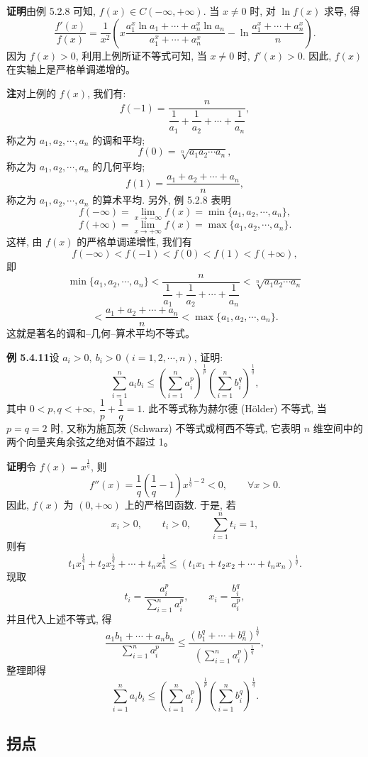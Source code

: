 \documentclass[UTF8, 12pt, fontset=fandol, oneside]{ctexart}
\begin{document}
\noindent\textbf{证明}\quad 由例 5.2.8 可知, $f(x)\in C(-\infty,+\infty)$. 当 $x\ne0$ 时, 对 $\ln f(x)$ 求导, 得
\[
  \frac{f'(x)}{f(x)}
  =\frac1{x^2}\left(
  x\frac{a_1^x\ln a_1+\cdots+a_n^x\ln a_n}{a_1^x+\cdots+a_n^x}
  -\ln\frac{a_1^x+\cdots+a_n^x}{n}\right).
\]
因为 $f(x)>0$, 利用上例所证不等式可知, 当 $x\ne0$ 时, $f'(x)>0$. 因此, $f(x)$ 在实轴上是严格单调递增的。

\noindent\textbf{注}\quad 对上例的 $f(x)$, 我们有:
\[
  f(-1)=\frac{n}{\dfrac1{a_1}+\dfrac1{a_2}+\cdots+\dfrac1{a_n}},
\]
称之为 $a_1,a_2,\cdots,a_n$ 的调和平均;
\[
  f(0)=\sqrt[n]{a_1a_2\cdots a_n},
\]
称之为 $a_1,a_2,\cdots,a_n$ 的几何平均;
\[
  f(1)=\frac{a_1+a_2+\cdots+a_n}{n},
\]
称之为 $a_1,a_2,\cdots,a_n$ 的算术平均. 另外, 例 5.2.8 表明
\[
  f(-\infty)=\lim_{x\to-\infty}f(x)=\min\{a_1,a_2,\cdots,a_n\},
\]
\[
  f(+\infty)=\lim_{x\to+\infty}f(x)=\max\{a_1,a_2,\cdots,a_n\}.
\]
这样, 由 $f(x)$ 的严格单调递增性, 我们有
\[
  f(-\infty)<f(-1)<f(0)<f(1)<f(+\infty),
\]
即
\[
  \min\{a_1,a_2,\cdots,a_n\}
  <\frac{n}{\dfrac1{a_1}+\dfrac1{a_2}+\cdots+\dfrac1{a_n}}
  <\sqrt[n]{a_1a_2\cdots a_n}
\]
\[
  <\frac{a_1+a_2+\cdots+a_n}{n}
  <\max\{a_1,a_2,\cdots,a_n\}.
\]
这就是著名的调和--几何--算术平均不等式。

\noindent\textbf{例 5.4.11}\quad 设 $a_i>0,\ b_i>0\ (i=1,2,\cdots,n)$, 证明:
\[
  \sum_{i=1}^n a_i b_i
  \leqslant
  \left(\sum_{i=1}^n a_i^p\right)^{\frac1p}
  \left(\sum_{i=1}^n b_i^q\right)^{\frac1q},
\]
其中 $0<p,q<+\infty,\ \dfrac1p+\dfrac1q=1$. 此不等式称为赫尔德 (H\"older) 不等式, 当 $p=q=2$ 时, 又称为施瓦茨 (Schwarz) 不等式或柯西不等式, 它表明 $n$ 维空间中的两个向量夹角余弦之绝对值不超过 1。

\noindent\textbf{证明}\quad 令 $f(x)=x^{\frac1q}$, 则
\[
  f''(x)=\frac1q\left(\frac1q-1\right)x^{\frac1q-2}<0,\qquad \forall x>0.
\]
因此, $f(x)$ 为 $(0,+\infty)$ 上的严格凹函数. 于是, 若
\[
  x_i>0,\qquad t_i>0,\qquad \sum_{i=1}^n t_i=1,
\]
则有
\[
  t_1x_1^{\frac1q}+t_2x_2^{\frac1q}+\cdots+t_nx_n^{\frac1q}
  \leqslant (t_1x_1+t_2x_2+\cdots+t_nx_n)^{\frac1q}.
\]
现取
\[
  t_i=\frac{a_i^p}{\sum_{i=1}^n a_i^p},\qquad x_i=\frac{b_i^q}{a_i^p},
\]
并且代入上述不等式, 得
\[
  \frac{a_1b_1+\cdots+a_nb_n}{\sum_{i=1}^n a_i^p}
  \leqslant
  \frac{(b_1^q+\cdots+b_n^q)^{\frac1q}}{\left(\sum_{i=1}^n a_i^p\right)^{\frac1q}},
\]
整理即得
\[
  \sum_{i=1}^n a_i b_i
  \leqslant
  \left(\sum_{i=1}^n a_i^p\right)^{\frac1p}
  \left(\sum_{i=1}^n b_i^q\right)^{\frac1q}.
\]

\subsection{拐点}
\end{document}
